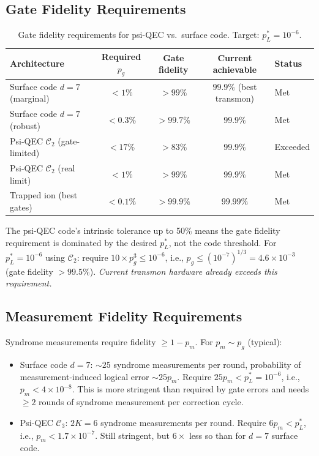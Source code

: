 \documentclass[11pt]{article}
\theoremstyle{definition}
\theoremstyle{remark}
\begin{document}
\subsection{Gate Fidelity Requirements}
\label{sec:gate-fidelity}

\begin{table}[h]
\centering
\caption{Gate fidelity requirements for psi-QEC vs.\ surface code.
  Target: $p_L^* = 10^{-6}$.}
\label{tab:fidelity}
\begin{tabular}{@{}lcccl@{}}
\toprule
Architecture & Required $p_g$ & Gate fidelity & Current achievable & Status \\
\midrule
Surface code $d=7$ (marginal) & $< 1\%$ & $> 99\%$ & $99.9\%$ (best transmon) & Met \\
Surface code $d=7$ (robust) & $< 0.3\%$ & $> 99.7\%$ & $99.9\%$ & Met \\
Psi-QEC $\mathcal{C}_2$ (gate-limited) & $< 17\%$ & $> 83\%$ & $99.9\%$ & Exceeded \\
Psi-QEC $\mathcal{C}_2$ (real limit) & $< 1\%$ & $> 99\%$ & $99.9\%$ & Met \\
Trapped ion (best gates) & $< 0.1\%$ & $> 99.9\%$ & $99.99\%$ & Met \\
\bottomrule
\end{tabular}
\end{table}

The psi-QEC code's intrinsic tolerance up to 50\% means the gate fidelity
requirement is dominated by the desired $p_L^*$, not the code threshold.
For $p_L^* = 10^{-6}$ using $\mathcal{C}_2$: require $10\times p_g^3 \leq 10^{-6}$,
i.e., $p_g \leq (10^{-7})^{1/3} = 4.6\times10^{-3}$ (gate fidelity $> 99.5\%$).
\emph{Current transmon hardware already exceeds this requirement.}

\subsection{Measurement Fidelity Requirements}
\label{sec:measurement-fidelity}

Syndrome measurements require fidelity $\geq 1 - p_m$.  For $p_m \sim p_g$
(typical):
\begin{itemize}
  \item Surface code $d=7$: $\sim25$ syndrome measurements per round,
    probability of measurement-induced logical error $\sim 25p_m$.
    Require $25p_m < p_L^* = 10^{-6}$, i.e., $p_m < 4\times10^{-8}$.
    This is more stringent than required by gate errors and needs
    $\geq 2$ rounds of syndrome measurement per correction cycle.
  \item Psi-QEC $\mathcal{C}_3$: $2K = 6$ syndrome measurements per round.
    Require $6p_m < p_L^*$, i.e., $p_m < 1.7\times10^{-7}$.
    Still stringent, but $6\times$ less so than for $d=7$ surface code.
\end{itemize}
\end{document}

